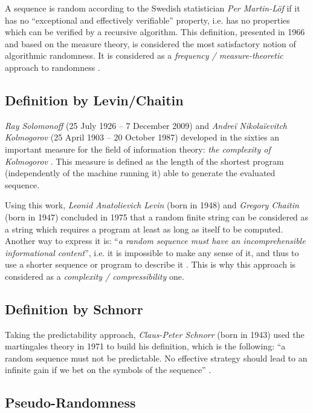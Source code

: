 \documentclass{llncs}
\begin{document}
A sequence is random according to the Swedish statistician \emph{Per Martin-L\"{o}f} if it has no ``exceptional and effectively verifiable'' property, i.e. has no properties which can be verified by a recursive algorithm. This definition, presented in 1966 and based on the measure theory, is considered the most satisfactory notion of algorithmic randomness. It is considered as a \textit{frequency / measure-theoretic} approach to randomness \cite{down}.

\subsection{Definition by Levin/Chaitin}

\emph{Ray Solomonoff} (25 July 1926 – 7 December 2009) and \emph{Andreï Nikolaïevitch Kolmogorov} (25 April 1903 – 20 October 1987) developed in the sixties an important measure for the field of information theory: \emph{the complexity of Kolmogorov} \cite{down}. This measure is defined as the length of the shortest program (independently of the machine running it) able to generate the evaluated sequence. 


Using this work, \emph{Leonid Anatolievich Levin} (born in 1948) and \emph{Gregory Chaitin} (born in 1947) concluded in 1975 that a random finite string can be considered as a string which requires a program at least as long as itself to be computed. Another way to express it is: ``\textit{a random sequence must have an incomprehensible informational content}'', i.e. it is impossible to make any sense of it, and thus to use a shorter sequence or program to describe it \cite{down}. This is why this approach is considered as a \textit{complexity / compressibility} one.

\subsection{Definition by Schnorr}

Taking the predictability approach, \emph{Claus-Peter Schnorr} (born in 1943) used the martingales theory in 1971 to build his definition, which is the following: ``a random sequence must not be predictable. No effective strategy should lead to an infinite gain if we bet on the symbols of the sequence'' \cite{down}.



\subsection{Pseudo-Randomness}
\end{document}
